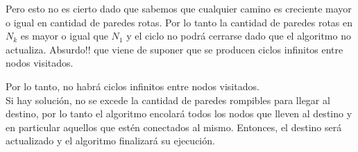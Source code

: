Pero esto no es cierto dado que sabemos que cualquier camino es creciente mayor o igual en cantidad de paredes rotas. 
Por lo tanto la cantidad de paredes rotas en $N_k$ es mayor o igual que $N_1$ y el ciclo no podrá cerrarse dado que el algoritmo no actualiza. Absurdo!! que viene de suponer que se producen ciclos infinitos entre nodos visitados.

Por lo tanto, no habrá ciclos infinitos entre nodos visitados.\\

Si hay solución, no se excede la cantidad de paredes rompibles para llegar al destino, por lo tanto el algoritmo encolará todos los nodos que lleven al destino y en particular aquellos que estén conectados al mismo. Entonces, el destino será actualizado y el algoritmo finalizará su ejecución.
